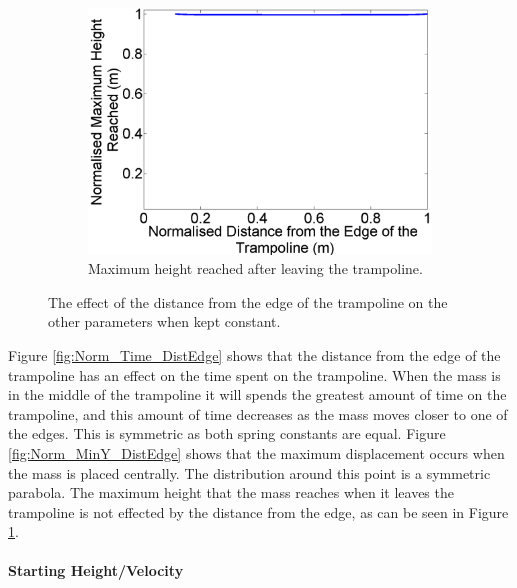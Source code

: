 \begin{figure}[H]
\begin{subfigure}[t]{0.3\textwidth}
		\includegraphics[width=\textwidth]{Norm_Height_DistEdge.png}
    	\caption{Maximum height reached after leaving the trampoline.}\label{fig:Norm_Height_DistEdge}
    \end{subfigure}\hfill
    \caption{The effect of the distance from the edge of the trampoline on the other parameters when kept constant.}\label{fig:Norm_DistEdge}
\end{figure}
\noindent Figure \ref{fig:Norm_Time_DistEdge} shows  that the distance from the edge of the trampoline has an effect on the time spent on the trampoline.  When the mass is in the middle of the trampoline it will spends the greatest amount of time on the trampoline, and this amount of time decreases as the mass moves closer to one of the edges. This is symmetric as both spring constants are equal.
 Figure \ref{fig:Norm_MinY_DistEdge} shows that the maximum displacement occurs when the mass is placed centrally. The distribution around this point is a symmetric parabola. 
The maximum height that the mass reaches when it leaves the trampoline is not effected by the distance from the edge, as can be seen in Figure \ref{fig:Norm_Height_DistEdge}. 

\paragraph{Starting Height/Velocity}\mbox{}\\

